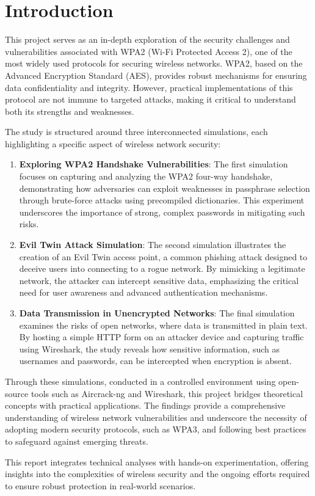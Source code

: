\chapter{Introduction}

This project serves as an in-depth exploration of the security challenges and vulnerabilities associated with WPA2 (Wi-Fi Protected Access 2), one of the most widely used protocols for securing wireless networks. WPA2, based on the Advanced Encryption Standard (AES), provides robust mechanisms for ensuring data confidentiality and integrity. However, practical implementations of this protocol are not immune to targeted attacks, making it critical to understand both its strengths and weaknesses.

The study is structured around three interconnected simulations, each highlighting a specific aspect of wireless network security:

\begin{enumerate}
    \item \textbf{Exploring WPA2 Handshake Vulnerabilities}: The first simulation focuses on capturing and analyzing the WPA2 four-way handshake, demonstrating how adversaries can exploit weaknesses in passphrase selection through brute-force attacks using precompiled dictionaries. This experiment underscores the importance of strong, complex passwords in mitigating such risks.

    \item \textbf{Evil Twin Attack Simulation}: The second simulation illustrates the creation of an Evil Twin access point, a common phishing attack designed to deceive users into connecting to a rogue network. By mimicking a legitimate network, the attacker can intercept sensitive data, emphasizing the critical need for user awareness and advanced authentication mechanisms.

    \item \textbf{Data Transmission in Unencrypted Networks}: The final simulation examines the risks of open networks, where data is transmitted in plain text. By hosting a simple HTTP form on an attacker device and capturing traffic using Wireshark, the study reveals how sensitive information, such as usernames and passwords, can be intercepted when encryption is absent.
\end{enumerate}

Through these simulations, conducted in a controlled environment using open-source tools such as Aircrack-ng and Wireshark, this project bridges theoretical concepts with practical applications. The findings provide a comprehensive understanding of wireless network vulnerabilities and underscore the necessity of adopting modern security protocols, such as WPA3, and following best practices to safeguard against emerging threats.

This report integrates technical analyses with hands-on experimentation, offering insights into the complexities of wireless security and the ongoing efforts required to ensure robust protection in real-world scenarios.
